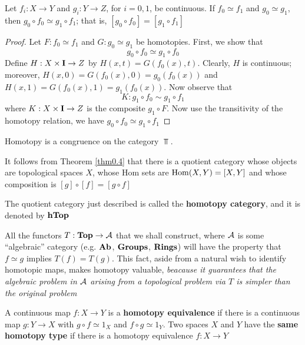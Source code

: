 \documentclass[11pt]{article}
\begin{document}
\begin{theorem}[]
\label{thm1.3}
Let \(f_i:X\to Y\) and \(g_i:Y\to Z\), for \(i=0,1\), be continuous. If \(f_0\simeq f_1\) and \(g_0\simeq g_1\),
then \(g_0\circ f_0\simeq g_1\circ f_1\); that is, \([g_0\circ f_0]=[g_1\circ f_1]\)
\end{theorem}

\begin{proof}
Let \(F:f_0\simeq f_1\) and \(G:g_0\simeq g_1\) be homotopies. First, we show that
\begin{equation*}
g_0\circ f_0\simeq g_1\circ f_0
\end{equation*}
Define \(H:X\times\operatorname{\textbf{I}}\to Z\) by \(H(x,t)=G(f_0(x),t)\). Clearly, \(H\) is continuous;
moreover, \(H(x,0)=G(f_0(x),0)=g_0(f_0(x))\) and \(H(x,1)=G(f_0(x),1)=g_1(f_0(x))\). Now observe
that
\begin{equation*}
K:g_1\circ f_0\sim g_1\circ f_1
\end{equation*}
where \(K:X\times\operatorname{\textbf{I}}\to Z\) is the composite \(g_1\circ F\). Now use the transitivity of the homotopy relation,
we have \(g_0\circ f_0\simeq g_1\circ f_1\)
\end{proof}

\begin{corollary}[]
Homotopy is a congruence on the category \(\Top\).
\end{corollary}

It follows from Theorem \ref{thm0.4} that there is a quotient category whose objects are
topological spaces \(X\), whose Hom sets are \(\operatorname{Hom}(X,Y)=[X,Y]\) and whose composition
is \([g]\circ[f]=[g\circ f]\)

\begin{definition}[]
The quotient category just described is called the \textbf{homotopy category}, and it is denoted by
\(\operatorname{\textbf{hTop}}\)
\end{definition}

All the functors \(T:\operatorname{\textbf{Top}}\to\mathcal{A}\) that we shall construct, where \(\mathcal{A}\) is some ``algebraic'' category
(e.g. \(\operatorname{\textbf{Ab}}\), \(\operatorname{\textbf{Groups}}\), \(\operatorname{\textbf{Rings}}\)) will have the property that \(f\simeq g\)
implies \(T(f)=T(g)\). This fact, aside from a natural wish to identify homotopic maps, makes
homotopy valuable, \emph{beacause it guarantees that the algebraic problem in \(\mathcal{A}\) arising from a}
\emph{topological problem via \(T\) is simpler than the original problem}

\begin{definition}[]
A continuous map \(f:X\to Y\) is a \textbf{homotopy equivalence} if there is a continuous map \(g:Y\to X\)
with \(g\circ f\simeq 1_X\) and \(f\circ g\simeq 1_Y\). Two spaces \(X\) and \(Y\) have the \textbf{same homotopy type} if
there is a homotopy equivalence \(f:X\to Y\)
\end{definition}
\end{document}
